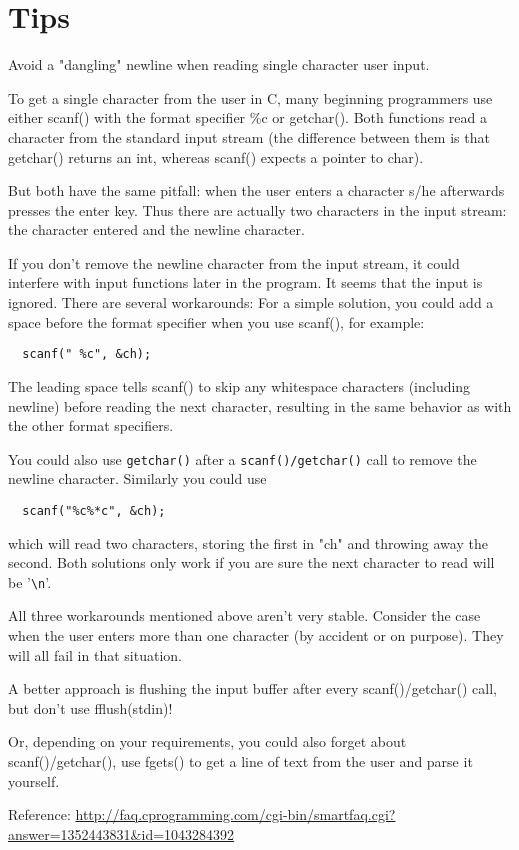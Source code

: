 \section{Tips}
\begin{tip}
   Avoid a "dangling" newline when reading single character user input.
\end{tip}
\begin{solution}
  To get a single character from the user in C, many beginning programmers use either scanf() with the format specifier \%c or getchar(). Both functions read a character from the standard input stream (the difference between them is that getchar() returns an int, whereas scanf() expects a pointer to char).

  But both have the same pitfall: when the user enters a character s/he afterwards presses the enter key. Thus there are actually two characters in the input stream: the character entered and the newline character.

  If you don't remove the newline character from the input stream, it could interfere with input functions later in the program. It seems that the input is ignored.
  There are several workarounds:
  For a simple solution, you could add a space before the format specifier when you use scanf(), for example:

  \begin{verbatim}
  scanf(" %c", &ch);
  \end{verbatim}

  The leading space tells scanf() to skip any whitespace characters (including newline) before reading the next character, resulting in the same behavior as with the other format specifiers.

  You could also use \verb|getchar()| after a \verb|scanf()/getchar()| call to remove the newline character. Similarly you could use

  \begin{verbatim}
  scanf("%c%*c", &ch);
  \end{verbatim}

  which will read two characters, storing the first in "ch" and throwing away the second. Both solutions only work if you are sure the next character to read will be '\verb|\n|'.

  All three workarounds mentioned above aren't very stable. Consider the case when the user enters more than one character (by accident or on purpose). They will all fail in that situation.

  A better approach is flushing the input buffer after every scanf()/getchar() call, but don't use fflush(stdin)!

  Or, depending on your requirements, you could also forget about scanf()/getchar(), use fgets() to get a line of text from the user and parse it yourself.

  Reference: \url{http://faq.cprogramming.com/cgi-bin/smartfaq.cgi?answer=1352443831&id=1043284392}
\end{solution}
